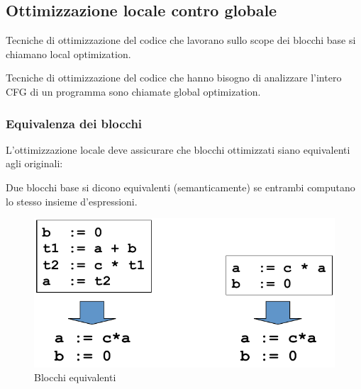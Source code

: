 \subsection{Ottimizzazione locale contro globale}
\begin{definition}
Tecniche di ottimizzazione del codice che lavorano sullo scope dei blocchi base
si chiamano local optimization.
\end{definition}
\begin{definition}
Tecniche di ottimizzazione del codice che hanno bisogno di analizzare l'intero
CFG di un programma sono chiamate global optimization.
\end{definition}

\subsubsection{Equivalenza dei blocchi}
L'ottimizzazione locale deve assicurare che blocchi ottimizzati siano
equivalenti agli originali:

\begin{definition}
Due blocchi base si dicono equivalenti (semanticamente) se entrambi computano
lo stesso insieme d'espressioni.
\end{definition}

\begin{figure}[H]
  \centering
  \includegraphics[scale=0.4]{res/image/equivalent_block}
  \caption{Blocchi equivalenti}
  \label{img:equivalent_block}
\end{figure}

